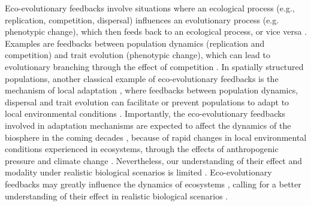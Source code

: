 % 
Eco-evolutionary feedbacks involve situations where an ecological process (e.g., replication, competition, dispersal) influences an evolutionary process (e.g. phenotypic change), which then feeds back to an ecological process, or vice versa \citep{Govaert2019a}. Examples are feedbacks between population dynamics (replication and competition) and trait evolution (phenotypic change), which can lead to evolutionary branching through the effect of competition \citep{Doebeli1999}.
% 
In spatially structured populations, another classical example of eco-evolutionary feedbacks is the mechanism of local adaptation \citep{Savolainen2007}, where feedbacks between population dynamics, dispersal and trait evolution can facilitate or prevent populations to adapt to local environmental conditions \citep{Meszena1997,Doebeli2003}.
% 
Importantly, the eco-evolutionary feedbacks involved in adaptation mechanisms are expected to affect the dynamics of the biosphere in the coming decades \citep{Norberg2012,Urban2016}, because of rapid changes in local environmental conditions experienced in ecosystems, through the effects of anthropogenic pressure and climate change \citep{Ellis2011,Midgley2019}.
% 
Nevertheless, our understanding of their effect and modality under realistic biological scenarios is limited \citep{Lion2022}.
% 
% 
Eco-evolutionary feedbacks may greatly influence the dynamics of ecosystems \citep{Norberg2012,Urban2016}, calling for a better understanding of their effect in realistic biological scenarios \citep{Lion2022}. 
% 
% 


